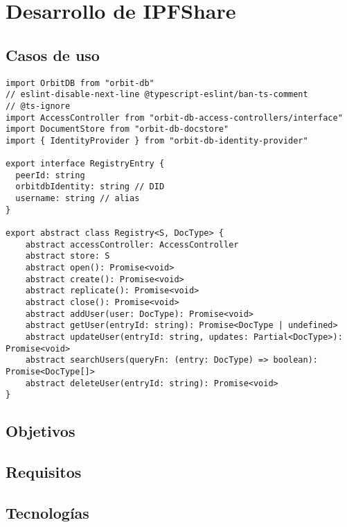 \chapter{Desarrollo de IPFShare}\label{chap:4desarrollo}

\section{Casos de uso}

\begin{verbatim}
import OrbitDB from "orbit-db"
// eslint-disable-next-line @typescript-eslint/ban-ts-comment
// @ts-ignore
import AccessController from "orbit-db-access-controllers/interface"
import DocumentStore from "orbit-db-docstore"
import { IdentityProvider } from "orbit-db-identity-provider"

export interface RegistryEntry {
  peerId: string
  orbitdbIdentity: string // DID
  username: string // alias
}

export abstract class Registry<S, DocType> {
    abstract accessController: AccessController
    abstract store: S
    abstract open(): Promise<void> 
    abstract create(): Promise<void>
    abstract replicate(): Promise<void>
    abstract close(): Promise<void>
    abstract addUser(user: DocType): Promise<void>
    abstract getUser(entryId: string): Promise<DocType | undefined>
    abstract updateUser(entryId: string, updates: Partial<DocType>): Promise<void>
    abstract searchUsers(queryFn: (entry: DocType) => boolean): Promise<DocType[]>
    abstract deleteUser(entryId: string): Promise<void>
}

\end{verbatim}

\section{Objetivos}


\section{Requisitos}


\section{Tecnologías}
